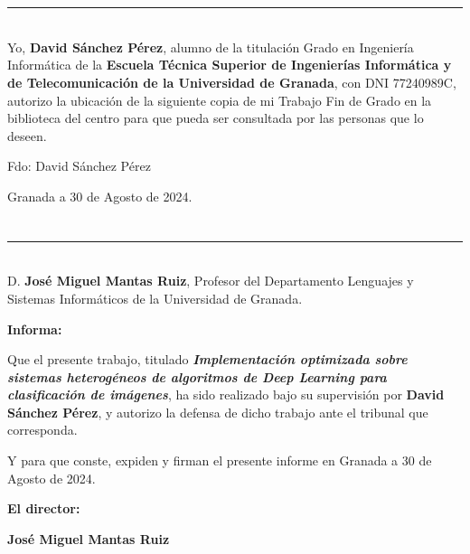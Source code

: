 \chapter*{}
\thispagestyle{empty}

\noindent\rule[-1ex]{\textwidth}{2pt}\\[4.5ex]

Yo, \textbf{David Sánchez Pérez}, alumno de la titulación Grado en Ingeniería Informática de la \textbf{Escuela Técnica Superior
de Ingenierías Informática y de Telecomunicación de la Universidad de Granada}, con DNI 77240989C, autorizo la
ubicación de la siguiente copia de mi Trabajo Fin de Grado en la biblioteca del centro para que pueda ser
consultada por las personas que lo deseen.

\vspace{6cm}

\noindent Fdo: David Sánchez Pérez

\vspace{2cm}

\begin{flushright}
Granada a 30 de Agosto de 2024.
\end{flushright}


\chapter*{}
\thispagestyle{empty}

\noindent\rule[-1ex]{\textwidth}{2pt}\\[4.5ex]

D. \textbf{José Miguel Mantas Ruiz}, Profesor del Departamento Lenguajes y Sistemas Informáticos de la Universidad de Granada.

\vspace{0.5cm}


\textbf{Informa:}

\vspace{0.5cm}

Que el presente trabajo, titulado \textit{\textbf{Implementación optimizada sobre sistemas heterogéneos de algoritmos de Deep Learning para clasificación de imágenes}},
ha sido realizado bajo su supervisión por \textbf{David Sánchez Pérez}, y autorizo la defensa de dicho trabajo ante el tribunal
que corresponda.

\vspace{0.5cm}

Y para que conste, expiden y firman el presente informe en Granada a 30 de Agosto de 2024.

\vspace{1cm}

\textbf{El director:}

\vspace{5cm}

\noindent \textbf{José Miguel Mantas Ruiz}


